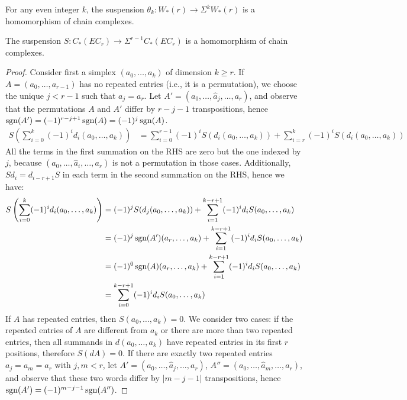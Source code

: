 \begin{remark}
	For any even integer $k$, the suspension $\theta_{k}\colon W_*(r)\to \Sigma^{k}W_*(r)$ is a homomorphism of chain complexes.
\end{remark}

\begin{lemma}
	The suspension $S\colon C_*(EC_r)\to \Sigma^{r-1}C_*(EC_r)$ is a homomorphism of chain complexes.
\end{lemma}

\begin{proof}
	Consider first a simplex $(a_0,\ldots,a_k)$ of dimension $k\geq r$. If $A=(a_{0},\ldots,a_{r-1})$ has no repeated entries (i.e., it is a permutation), we choose the unique $j<r-1$ such that $a_j = a_r$. Let $A' = (a_{0},\ldots,\hat{a}_j,\ldots,a_r)$, and observe that the permutations $A$ and $A'$ differ by $r-j-1$ transpositions, hence $\operatorname*{sgn}(A') = (-1)^{r-j+1}\operatorname*{sgn}(A) = (-1)^j\operatorname*{sgn}(A)$.
	\begin{align*}
		S\left(\sum_{i=0}^k (-1)^id_i (a_0,\ldots,a_k)\right)
		&= \sum_{i=0}^{r-1} (-1)^iS(d_i (a_0,\ldots,a_k)) + \sum_{i=r}^{k} (-1)^iS(d_i (a_0,\ldots,a_k))
	\end{align*}
	All the terms in the first summation on the RHS are zero but the one indexed by $j$, because $(a_0,\ldots,\hat{a}_i,\ldots,a_r)$ is not a permutation in those cases. Additionally, $Sd_i = d_{i-r+1}S$ in each term in the second summation on the RHS, hence we have:
	\begin{align*}
		S\left(\sum_{i=0}^k (-1)^id_i (a_0,\ldots,a_k)\right)
		&= (-1)^jS(d_j (a_0,\ldots,a_k)) + \sum_{i=1}^{k-r+1} (-1)^i d_i S(a_0,\ldots,a_k)\\
		&= (-1)^{j}\operatorname*{sgn}(A')(a_r,\ldots,a_k) + \sum_{i=1}^{k-r+1} (-1)^i d_i S(a_0,\ldots,a_k)\\
		&= (-1)^{0}\operatorname*{sgn}(A)(a_r,\ldots,a_k) + \sum_{i=1}^{k-r+1} (-1)^i d_i S(a_0,\ldots,a_k)\\
		&= \sum_{i=0}^{k-r+1} (-1)^i d_i S(a_0,\ldots,a_k)
	\end{align*}
	If $A$ has repeated entries, then $S(a_0,\ldots,a_k) = 0$. We consider two cases: if the repeated entries of $A$ are different from $a_k$ or there are more than two repeated entries, then all summands in $d(a_0,\ldots,a_k)$ have repeated entries in its first $r$ positions, therefore $S(dA)=0$. If there are exactly two repeated entries $a_j=a_m = a_r$ with $j,m<r$, let $A' = (a_0,\ldots,\hat{a}_j,\ldots,a_{r})$, $A'' = (a_0,\ldots,\hat{a}_m,\ldots,a_{r})$, and observe that these two words differ by $|m-j-1|$ transpositions, hence $\operatorname*{sgn}(A') = (-1)^{m-j-1}\operatorname*{sgn}(A'')$.

\end{proof}
